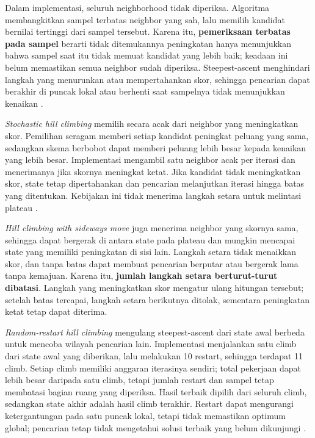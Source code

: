 \documentclass[12pt,a4paper]{article}
\begin{document}
Dalam implementasi, seluruh neighborhood tidak diperiksa. Algoritma membangkitkan sampel terbatas neighbor yang sah, lalu memilih kandidat bernilai tertinggi dari sampel tersebut. Karena itu, \textbf{pemeriksaan terbatas pada sampel} berarti tidak ditemukannya peningkatan hanya menunjukkan bahwa sampel saat itu tidak memuat kandidat yang lebih baik; keadaan ini belum memastikan semua neighbor sudah diperiksa. Steepest-ascent menghindari langkah yang menurunkan atau mempertahankan skor, sehingga pencarian dapat berakhir di puncak lokal atau berhenti saat sampelnya tidak menunjukkan kenaikan \cite{russell-norvig,slide-local-search}.

\textit{Stochastic hill climbing} memilih secara acak dari neighbor yang meningkatkan skor. Pemilihan seragam memberi setiap kandidat peningkat peluang yang sama, sedangkan skema berbobot dapat memberi peluang lebih besar kepada kenaikan yang lebih besar. Implementasi mengambil satu neighbor acak per iterasi dan menerimanya jika skornya meningkat ketat. Jika kandidat tidak meningkatkan skor, state tetap dipertahankan dan pencarian melanjutkan iterasi hingga batas yang ditentukan. Kebijakan ini tidak menerima langkah setara untuk melintasi plateau \cite{russell-norvig,slide-local-search}.

\textit{Hill climbing with sideways move} juga menerima neighbor yang skornya sama, sehingga dapat bergerak di antara state pada plateau dan mungkin mencapai state yang memiliki peningkatan di sisi lain. Langkah setara tidak menaikkan skor, dan tanpa batas dapat membuat pencarian berputar atau bergerak lama tanpa kemajuan. Karena itu, \textbf{jumlah langkah setara berturut-turut dibatasi}. Langkah yang meningkatkan skor mengatur ulang hitungan tersebut; setelah batas tercapai, langkah setara berikutnya ditolak, sementara peningkatan ketat tetap dapat diterima.

\textit{Random-restart hill climbing} mengulang steepest-ascent dari state awal berbeda untuk mencoba wilayah pencarian lain. Implementasi menjalankan satu climb dari state awal yang diberikan, lalu melakukan 10 restart, sehingga terdapat 11 climb. Setiap climb memiliki anggaran iterasinya sendiri; total pekerjaan dapat lebih besar daripada satu climb, tetapi jumlah restart dan sampel tetap membatasi bagian ruang yang diperiksa. Hasil terbaik dipilih dari seluruh climb, sedangkan state akhir adalah hasil climb terakhir. Restart dapat mengurangi ketergantungan pada satu puncak lokal, tetapi tidak memastikan optimum global; pencarian tetap tidak mengetahui solusi terbaik yang belum dikunjungi \cite{russell-norvig,slide-local-search}.
\end{document}
